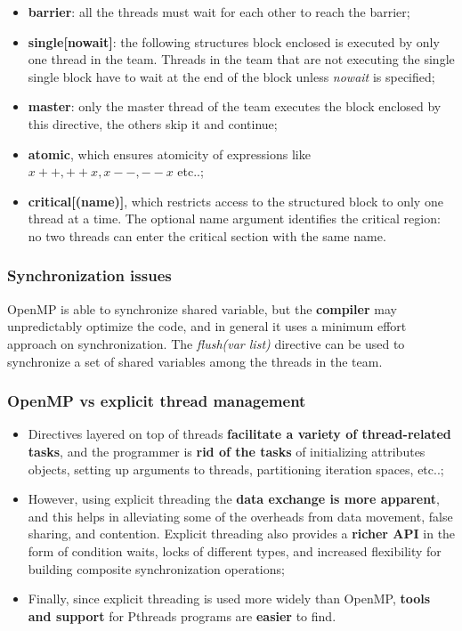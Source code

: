 \begin{itemize}
    \item \textbf{barrier}: all the threads must wait for each other to reach the barrier;
    \item \textbf{single[nowait]}: the following structures block enclosed is executed by only one thread in the team. Threads in the team that are not executing the single single block have to wait at the end of the block unless \textit{nowait} is specified;
    \item \textbf{master}: only the master thread of the team executes the block enclosed by this directive, the others skip it and continue;
    \item \textbf{atomic}, which ensures atomicity of expressions like $x++, ++x, x--, --x$ etc..;
    \item \textbf{critical[(name)]}, which restricts access to the structured block to only one thread at a time. The optional name argument identifies the critical region: no two threads can enter the critical section with the same name.
\end{itemize}

\subsubsection{Synchronization issues}
OpenMP is able to synchronize shared variable, but the \textbf{compiler} may unpredictably optimize the code, and in general it uses a minimum effort approach on synchronization. The \textit{flush(var list)} directive can be used to synchronize a set of shared variables among the threads in the team.

\subsubsection{OpenMP vs explicit thread management}
\begin{itemize}
    \item Directives layered on top of threads \textbf{facilitate a variety of
    thread-related tasks}, and the programmer is \textbf{rid of the tasks} of initializing attributes objects, setting up arguments to threads, partitioning iteration spaces, etc..;
    \item However, using explicit threading the \textbf{data exchange is more apparent}, and this helps in alleviating some of the overheads from data movement, false sharing, and contention. Explicit threading also provides a \textbf{richer API} in the form of condition waits, locks of different types, and increased flexibility for building composite synchronization operations;
    \item Finally, since explicit threading is used more widely than OpenMP, \textbf{tools and support} for Pthreads programs are \textbf{easier} to find.
\end{itemize}

